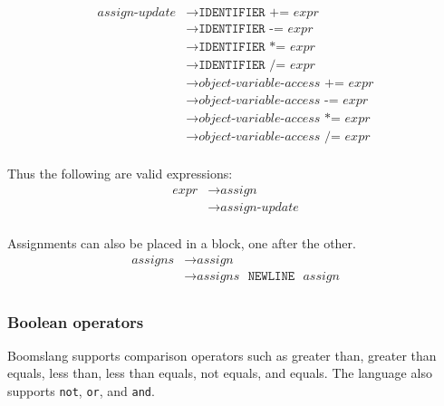 \documentclass{article}
\begin{document}
\label{sec:assign-update}
\begin{align*}
    \textit{assign-update} &\to \texttt{IDENTIFIER} \texttt{ += } \hyperref[sec:expr]{\textit{expr}} \\
    &\to \texttt{IDENTIFIER} \texttt{ -= } \hyperref[sec:expr]{\textit{expr}} \\
    &\to \texttt{IDENTIFIER} \texttt{ *= } \hyperref[sec:expr]{\textit{expr}} \\
    &\to \texttt{IDENTIFIER} \texttt{ /= } \hyperref[sec:expr]{\textit{expr}} \\
    &\to \hyperref[sec:object-variable-access]{\textit{object-variable-access}} \texttt{ += } \hyperref[sec:expr]{\textit{expr}} \\
    &\to \hyperref[sec:object-variable-access]{\textit{object-variable-access}} \texttt{ -= } \hyperref[sec:expr]{\textit{expr}} \\
    &\to \hyperref[sec:object-variable-access]{\textit{object-variable-access}} \texttt{ *= } \hyperref[sec:expr]{\textit{expr}} \\
    &\to \hyperref[sec:object-variable-access]{\textit{object-variable-access}} \texttt{ /= } \hyperref[sec:expr]{\textit{expr}} \\
\end{align*}

Thus the following are valid expressions:
\begin{align*}
    \textit{expr} &\to \hyperref[sec:assign]{\textit{assign}} \\
    &\to \hyperref[sec:assign-update]{\textit{assign-update}} \\
\end{align*}

Assignments can also be placed in a block, one after the other.
\label{sec:assigns}
\begin{align*}
    \textit{assigns} &\to \hyperref[sec:assign]{\textit{assign}} \\
    &\to \hyperref[sec:assigns]{\textit{assigns}} \texttt{ } \texttt{NEWLINE} \texttt{ } \hyperref[sec:assign]{\textit{assign}} \\
\end{align*}

\subsubsection{Boolean operators}
\label{sec:expr-boolean-operators}
Boomslang supports comparison operators such as greater than, greater than equals, less than, less than equals, not equals, and equals. The language also supports \texttt{not}, \texttt{or}, and \texttt{and}.
\end{document}
